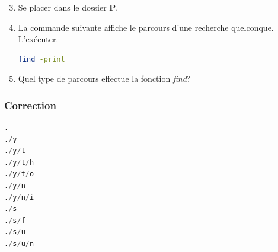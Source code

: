 \documentclass[svgnames,11pt]{beamer}
\begin{document}
\begin{frame}[fragile]
    \frametitle{}

    \begin{activite}
    \begin{enumerate}
        \setcounter{enumi}{2}
        \item Se placer dans le dossier \textbf{P}.
            \item La commande suivante affiche le parcours d'une recherche quelconque. L'exécuter.
            \begin{lstlisting}[language=bash , basicstyle=\ttfamily\small, xleftmargin=2em, xrightmargin=2em]
find -print
\end{lstlisting}
            \item Quel type de parcours effectue la fonction \emph{find}?
    \end{enumerate}
    \end{activite}

\end{frame}
\begin{frame}[fragile]
    \frametitle{Correction}

    \begin{center}
    \begin{lstlisting}[language=Python , basicstyle=\ttfamily\small, xleftmargin=2em, xrightmargin=2em]
.
./y
./y/t
./y/t/h
./y/t/o
./y/n
./y/n/i
./s
./s/f
./s/u
./s/u/n
\end{lstlisting}
    \label{CODE}
    \end{center}

\end{frame}
\end{document}
